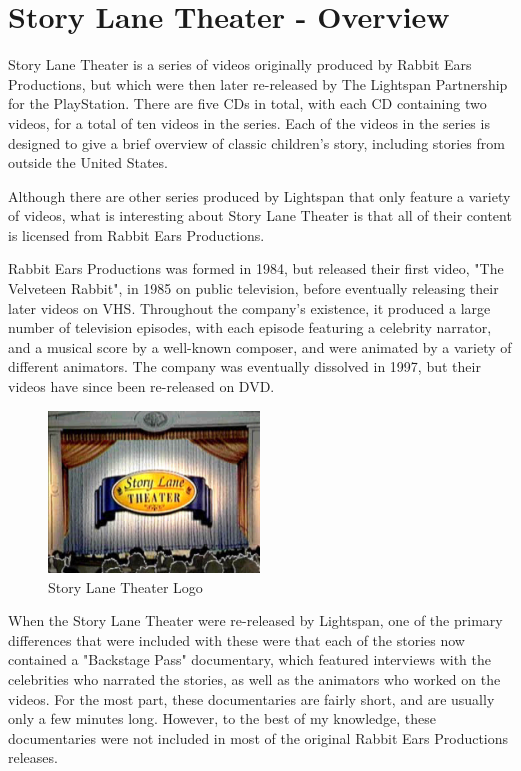 \chapter{Story Lane Theater - Overview}

Story Lane Theater is a series of videos originally produced by Rabbit Ears Productions, but which were then later re-released by The Lightspan Partnership for the PlayStation. There are five CDs in total, with each CD containing two videos, for a total of ten videos in the series. Each of the videos in the series is designed to give a brief overview of classic children's story, including stories from outside the United States.

Although there are other series produced by Lightspan that only feature a variety of videos, what is interesting about Story Lane Theater is that all of their content is licensed from Rabbit Ears Productions.

Rabbit Ears Productions was formed in 1984, but released their first video, "The Velveteen Rabbit", in 1985 on public television, before eventually releasing their later videos on VHS. Throughout the company's existence, it produced a large number of television episodes, with each episode featuring a celebrity narrator, and a musical score by a well-known composer, and were animated by a variety of different animators. The company was eventually dissolved in 1997, but their videos have since been re-released on DVD.

\begin{figure}[H]
    \centering
    \includegraphics[width=0.5\textwidth]{./Games/StoryLaneTheater/Images/StoryLaneTheaterMainImage.png}
    \caption{Story Lane Theater Logo}
\end{figure}

When the Story Lane Theater were re-released by Lightspan, one of the primary differences that were included with these were that each of the stories now contained a "Backstage Pass" documentary, which featured interviews with the celebrities who narrated the stories, as well as the animators who worked on the videos. For the most part, these documentaries are fairly short, and are usually only a few minutes long. However, to the best of my knowledge, these documentaries were not included in most of the original Rabbit Ears Productions releases.


